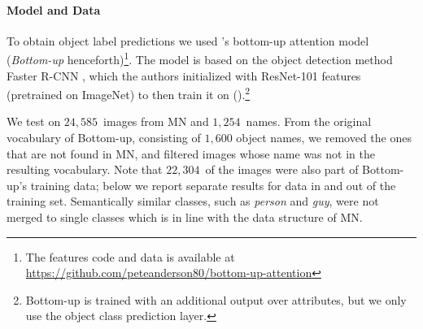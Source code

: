 \paragraph{Model and Data}
To obtain object label predictions we used \citeauthor{anderson2018updown}'s \citeyear{anderson2018updown} bottom-up attention model (\textit{Bottom-up} henceforth)\footnote{The features code and data is available at \url{https://github.com/peteanderson80/bottom-up-attention}}. 
The model is based on the object detection method Faster R-CNN \cite{fasterrcnn2015}, which the authors  initialized with ResNet-101 \cite{he2016deep} features (pretrained on ImageNet) to then train it on \vgenome (\vg).\footnote{Bottom-up is trained with an additional output over attributes, but we only use the object class prediction layer.} 
%
\iffalse
"To pretrain the bottom-up attention model, we first initialize Faster R-CNN with ResNet-101 pretrained for classification on ImageNet [35]. We then train on Visual
Genome [21] data. To aid the learning of good feature
representations, we add an additional training output for
predicting attribute classes (in addition to object classes).
To predict attributes for region i, we concatenate the mean
pooled convolutional feature vi with a learned embedding
of the ground-truth object class, and feed this into an additional output layer defining a softmax distribution over each
attribute class plus a ‘no attributes’ class.
The original Faster R-CNN multi-task loss function contains four components, defined over the classification and
bounding box regression outputs for both the RPN and the
final object class proposals respectively. We retain these
components and add an additional multi-class loss component to train the attribute predictor"
\fi

We test on $24,585$~images from MN and $1,254$~names.
From the original vocabulary of Bottom-up, consisting of $1,600$ object names, we removed the ones  that are not found in MN, and filtered  images whose \vg name was not in the resulting vocabulary.
Note that $22,304$~of the images were also part of Bottom-up's training data; below we report separate results for data in and out of the training set.
Semantically similar classes, such as \textsl{person} and \textsl{guy}, were not merged to single classes which is in line with the data structure of MN.

